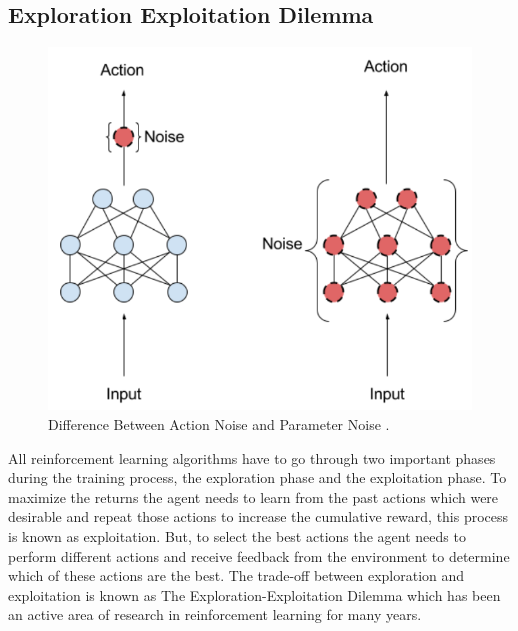 \subsection{Exploration Exploitation Dilemma}

\begin{figure}[h!]
    \centering
    \includegraphics[width=\textwidth]{images/ANPN.png}
    \caption{Difference Between Action Noise and Parameter Noise \cite{plappert2018parameter}.}
    \label{fig:HER}
\end{figure}

All reinforcement learning algorithms have to go through two important phases during the training process, the exploration phase and the exploitation phase. To maximize the returns the agent needs to learn from the past actions which were desirable and repeat those actions to increase the cumulative reward, this process is known as exploitation. But, to select the best actions the agent needs to perform different actions and receive feedback from the environment to determine which of these actions are the best. The trade-off between exploration and exploitation is known as The Exploration-Exploitation Dilemma which has been an active area of research in reinforcement learning for many years. \\

